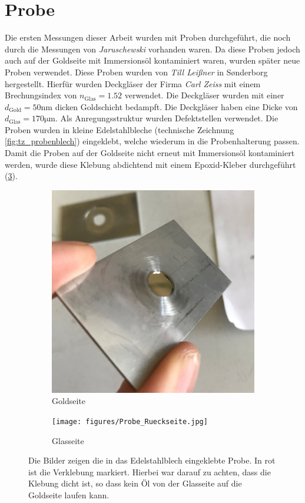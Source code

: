 \documentclass[a4paper, titlepage,  ngerman, fullpage]{book}
\begin{document}
	\section{Probe}
	Die ersten Messungen dieser Arbeit wurden mit Proben durchgeführt, die noch durch die Messungen von \textit{Jaruschewski} \cite{Jaruschewski.2020} vorhanden waren. Da diese Proben jedoch auch auf der Goldseite mit Immersionsöl kontaminiert waren, wurden später neue Proben verwendet. Diese Proben wurden von \textit{Till Leißner} in S\o nderborg hergestellt. Hierfür wurden Deckgläser der Firma \textit{Carl Zeiss} mit einem Brechungsindex von $n_{\mathrm{Glas}}= 1.52$ verwendet. Die Deckgläser wurden mit einer $d_{\mathrm{Gold}} = 50\mathrm{nm}$ dicken Goldschicht bedampft. Die Deckgläser haben eine Dicke von $d_{\mathrm{Glas}} = 170 \mathrm{\mu m}$. Als Anregungsstruktur wurden Defektstellen verwendet. Die Proben wurden in kleine Edelstahlbleche (technische Zeichnung \ref{fig:tz_probenblech}) eingeklebt, welche wiederum in die Probenhalterung passen. Damit die Proben auf der Goldseite nicht erneut mit Immersionsöl kontaminiert werden, wurde diese Klebung abdichtend mit einem Epoxid-Kleber durchgeführt (\ref{fig:probe}).
	\begin{figure}
		\centering
		\begin{subfigure}{0.4\textwidth}
			\centering
			\includegraphics[width=\textwidth]{figures/Probe_Vorderseite.jpg}
			\caption{Goldseite}
			\label{fig:probe_vorderseite}
		\end{subfigure}
		\hfill
		\begin{subfigure}{0.4\textwidth}
			\centering
			\texttt{[image: figures/Probe\_Rueckseite.jpg]}
			\caption{Glasseite}
			\label{fig:probe_rueckseite}
		\end{subfigure}
		\caption[Eingeklebte Probe]{Die Bilder zeigen die in das Edelstahlblech eingeklebte Probe. In rot ist die Verklebung markiert. Hierbei war darauf zu achten, dass die Klebung dicht ist, so dass kein Öl von der Glasseite auf die Goldseite laufen kann.}
		\label{fig:probe}
	\end{figure}
\end{document}

